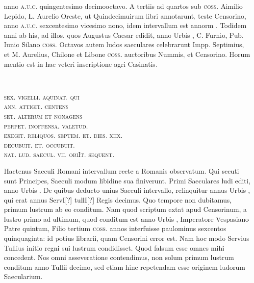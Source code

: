 anno \textsc{a.u.c.} quingentesimo decimooctavo.
A tertiis ad quartos sub
\textsc{coss.} Aimilio Lepido, L. Aurelio Oreste, ut Quindecimuirum
libri annotarunt, teste Censorino, anno \textsc{a.u.c.} sexcentesimo vicesimo
nono, idem intervallum est annorm .
Todidem anni ab
his, ad illos, quos Augustus Caesar edidit, anno Urbis ,
C. Furnio, Pub. Iunio Silano \textsc{coss.} Octavos autem ludos saeculares
celebrarunt Impp. Septimius, et M. Aurelius, Chilone et Libone
\textsc{coss.} auctoribus Nummis, et Censorino.
Horum mentio est
in hac veteri inscriptione agri Casinatis.
%
\begin{center}
\providelength{\emenlen}
\parbox{\emenlen}{
  \\
  \raggedright\textsc{sex. vigelli. aquinat. qui\\
  ann. attigit. centens\\
  set. alterum et nonagens\\
  perpet. inoffensa. valetud.\\
  exegit. reliquos. septem. et. dies. xiix.\\
  \hspace{4ex} decubuit. et. occubuit.\\
  nat. lud. saecul. vii. obiIt. sequent.}
}
\end{center}
Hactenus Saeculi Romani intervallum recte a
 Romanis observatum.
Qui secuti sunt Principes, Saeculi modum libidine sua finiverunt.
Primi
Saeculares ludi editi, anno Urbis .
De quibus deducto
unius Saeculi intervallo, relinquitur annus Urbis , qui
erat annus ServI[?] tullI[?] Regis decimus. %
Quo tempore non dubitamus,
primum lustrum ab eo conditum.
Nam quod scriptum extat apud
Censorinum, a lustro primo ad ultimum, quod conditum est anno
Urbis , Imperatore Vespasiano Patre quintum, Filio
tertium \textsc{coss.} annos
interfuisse paulominus
sexcentos quinquaginta:
id potius librarii,
quam Censorini
error est.
Nam
hoc modo Servius
Tullius initio regni
sui lustrum condidisset.
Quod falsum esse
omnes mihi concedent.
Nos omni asseveratione
contendimus,
non solum primum
lustrum conditum
anno Tullii decimo,
sed etiam hinc
repetendam esse originem
ludorum Saecularium.
